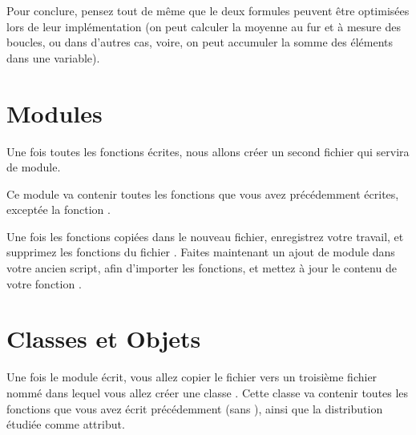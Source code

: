 \documentclass[11pt,a4paper]{article}
\begin{document}

Pour conclure, pensez tout de même que le deux formules peuvent être optimisées lors de leur implémentation (on peut calculer la moyenne au fur et à mesure des boucles, ou dans d'autres cas, voire, on peut accumuler la somme des éléments dans une variable).


\newpage %
\section{Modules}

\bigskip

Une fois toutes les fonctions écrites, nous allons créer un second fichier  qui servira de module.

\bigskip

Ce module va contenir toutes les fonctions que vous avez précédemment écrites, exceptée la fonction .

\bigskip


\bigskip

Une fois les fonctions copiées dans le nouveau fichier, enregistrez votre travail, et supprimez les fonctions du fichier .
Faites maintenant un ajout de module dans votre ancien script, afin d'importer les fonctions, et mettez à jour le contenu de votre fonction .

\bigskip





\newpage %
\section{Classes et Objets}

\bigskip

Une fois le module écrit, vous allez copier le fichier  vers un troisième fichier nommé   dans lequel vous allez créer une classe .
Cette classe va contenir toutes les fonctions que vous avez écrit précédemment (sans ), ainsi que la distribution étudiée comme attribut.
\end{document}
